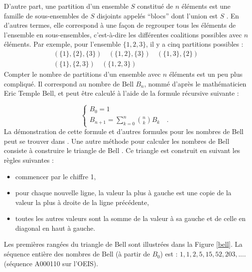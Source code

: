 D'autre part, une partition d'un ensemble $S$ constitué de $n$ éléments est une famille de sous-ensembles de $S$ disjoints appelés ``blocs'' dont l'union est $S$ \cite{Rota1964}.
En d'autres termes, elle correspond à une façon de regrouper tous les éléments de l'ensemble en sous-ensembles, c'est-à-dire les différentes coalitions possibles avec $n$ éléments. Par exemple, pour l'ensemble $\{1,2,3\}$, il y a cinq partitions possibles :
\begin{gather*}
(\{1\},\{2\},\{3\}) \quad (\{1,2\},\{3\}) \quad (\{1,3\},\{2\}) \\
(\{1\},\{2,3\}) \quad  (\{1,2,3\})
\end{gather*}
Compter le nombre de partitions d'un ensemble avec $n$ éléments est un peu plus compliqué. Il correspond au nombre de Bell $B_n$, nommé d'après le mathématicien Eric Temple Bell, et peut être calculé à l'aide de la formule récursive suivante :

\begin{equation}
    \begin{cases}
         B_0 = 1\\
         B_{n+1} = \sum\limits_{k=0}^n \binom nk B_k \quad \text{.}
     \end{cases}
\end{equation}
La démonstration de cette formule et d'autres formules pour les nombres de Bell peut se trouver dans \cite{Graham1988, Rota1964}.
Une autre méthode pour calculer les nombres de Bell consiste à construire le triangle de Bell \cite{Aitken1933}. Ce triangle est construit en suivant les règles suivantes :
\begin{itemize}
\item commencer par le chiffre 1,
\item pour chaque nouvelle ligne, la valeur la plus à gauche est une copie de la valeur la plus à droite de la ligne précédente,
\item toutes les autres valeurs sont la somme de la valeur à sa gauche et de celle en diagonal en haut à gauche.
\end{itemize}
 Les premières rangées du triangle de Bell sont illustrées dans la Figure \ref{bell}. La séquence entière des nombres de Bell (à partir de $B_0$) est : $1, 1, 2, 5, 15, 52, 203, ....$ (séquence A000110 sur l'OEIS).\\

